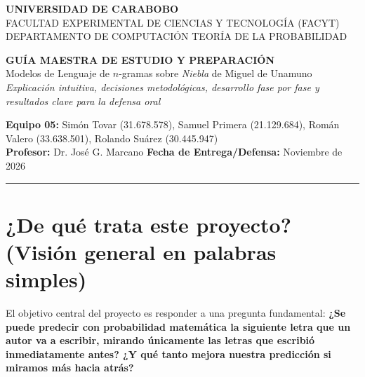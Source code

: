 \documentclass[11pt,letterpaper]{article}
\begin{document}
\begin{center}
    {\large \textbf{UNIVERSIDAD DE CARABOBO}}\\[2pt]
    {\normalsize FACULTAD EXPERIMENTAL DE CIENCIAS Y TECNOLOGÍA (FACYT)}\\[2pt]
    {\normalsize DEPARTAMENTO DE COMPUTACIÓN \textperiodcentered{} TEORÍA DE LA PROBABILIDAD}\\[10pt]
    
    \begin{tcolorbox}[colback=blue!8!white, colframe=blue!60!black, arc=3mm, width=\linewidth, halign=center]
        \vspace{4pt}
        {\Large \bfseries GUÍA MAESTRA DE ESTUDIO Y PREPARACIÓN}\\[4pt]
        {\large Modelos de Lenguaje de $n$-gramas sobre \textit{Niebla} de Miguel de Unamuno}\\[4pt]
        {\small \textit{Explicación intuitiva, decisiones metodológicas, desarrollo fase por fase y resultados clave para la defensa oral}}
        \vspace{4pt}
    \end{tcolorbox}
    \vspace{6pt}
    
    \textbf{Equipo 05:} Simón Tovar (31.678.578), Samuel Primera (21.129.684), Román Valero (33.638.501), Rolando Suárez (30.445.947)\\[2pt]
    \textbf{Profesor:} Dr. José G. Marcano \textperiodcentered{} \textbf{Fecha de Entrega/Defensa:} Noviembre de 2026
\end{center}

\vspace{5pt}
\hrule
\vspace{10pt}

\section{¿De qué trata este proyecto? (Visión general en palabras simples)}

El objetivo central del proyecto es responder a una pregunta fundamental: \textbf{¿Se puede predecir con probabilidad matemática la siguiente letra que un autor va a escribir, mirando únicamente las letras que escribió inmediatamente antes? ¿Y qué tanto mejora nuestra predicción si miramos más hacia atrás?}
\end{document}
